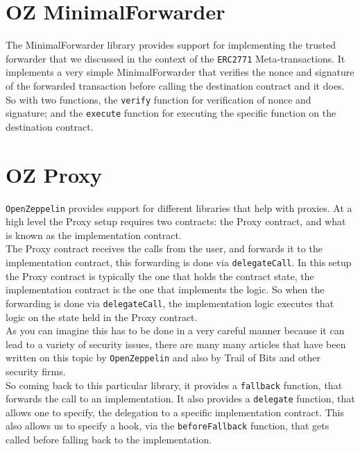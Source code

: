 \section{OZ MinimalForwarder}
The MinimalForwarder library provides support for implementing the trusted forwarder that we discussed in the context of the \verb|ERC2771| Meta-transactions. It implements a very simple MinimalForwarder that verifies the nonce and signature of the forwarded transaction before calling the destination contract and it does.\\

So with two functions, the \verb|verify| function for verification of nonce and signature; and the \verb|execute| function for executing the specific function on the destination contract.

\section{OZ Proxy}
\verb|OpenZeppelin| provides support for different libraries that help with proxies. At a high level the Proxy setup requires two contracts: the Proxy contract, and what is known as the implementation contract.\\

The Proxy contract receives the calls from the user, and forwards it to the implementation contract, this forwarding is done via \verb|delegateCall|. In this setup the Proxy contract is typically the one that holds the contract state, the implementation contract is the one that implements the logic. So when the forwarding is done via \verb|delegateCall|, the implementation logic executes that logic on the state held in the Proxy contract.\\

As you can imagine this has to be done in a very careful manner because it can lead to a variety of security issues, there are many many articles that have been written on this topic by \verb|OpenZeppelin| and also by Trail of Bits and other security firms.\\

So coming back to this particular library, it provides a \verb|fallback| function, that forwards the call to an implementation. It also provides a \verb|delegate| function, that allows one to specify, the delegation to a specific implementation contract. This also allows us to specify a hook, via the \verb|beforeFallback| function, that gets called before falling back to the implementation.

